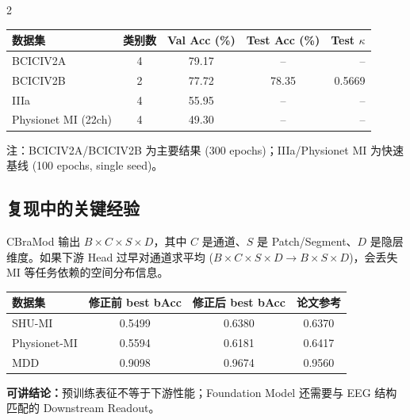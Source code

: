 \documentclass[12pt, a0paper]{article}
\renewcommand{\small}{\fontsize{18}{24}\selectfont}
\renewcommand{\footnotesize}{\fontsize{15}{20}\selectfont}
\begin{document}
\begin{multicols}{2}
{\footnotesize
\begin{center}
\begin{tabular}{lcccr}
\toprule
\textbf{数据集} & \textbf{类别数} & \textbf{Val Acc (\%)} & \textbf{Test Acc (\%)} & \textbf{Test \(\kappa\)} \\
\midrule
BCICIV2A & 4 & 79.17 & -- & -- \\
BCICIV2B & 2 & 77.72 & 78.35 & 0.5669 \\
IIIa & 4 & 55.95 & -- & -- \\
Physionet MI (22ch) & 4 & 49.30 & -- & -- \\
\bottomrule
\end{tabular}
\end{center}
\vspace{0.2em}
{\small\color{mygray}注：BCICIV2A/BCICIV2B 为主要结果 (300 epochs)；IIIa/Physionet MI 为快速基线 (100 epochs, single seed)。}
}

\vspace{1em}

\subsection{复现中的关键经验}

CBraMod 输出 $B \times C \times S \times D$，其中 $C$ 是通道、$S$ 是 Patch/Segment、$D$ 是隐层维度。如果下游 Head 过早对通道求平均 ($B \times C \times S \times D \rightarrow B \times S \times D$)，会丢失 MI 等任务依赖的空间分布信息。

\begin{center}
{\footnotesize
{}
\begin{tabular}{lccc}
\toprule
\textbf{数据集} & \textbf{修正前 best bAcc} & \textbf{修正后 best bAcc} & \textbf{论文参考} \\
\midrule
SHU-MI & 0.5499 & 0.6380 & 0.6370 \\
Physionet-MI & 0.5594 & 0.6181 & 0.6417 \\
MDD & 0.9098 & 0.9674 & 0.9560 \\
\bottomrule
\end{tabular}
}
\end{center}

\textbf{可讲结论：}预训练表征不等于下游性能；Foundation Model 还需要与 EEG 结构匹配的 Downstream Readout。


\end{multicols}
\end{document}
